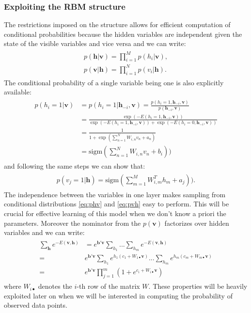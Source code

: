 \documentclass[../report/report.tex]{subfiles}
\begin{document}
\subsubsection{Exploiting the RBM structure}
The restrictions imposed on the structure allows for efficient computation of conditional probabilities because the hidden variables are independent given the state of the visible variables and vice versa and we can write:
\begin{align}
\begin{split}
p(\mathbf{h}| \mathbf{v}) = \prod_{i = 1}^{M} p(h_i |\mathbf{v}), \\
p(\mathbf{v}| \mathbf{h}) = \prod_{i = 1}^{N} p(v_i |\mathbf{h}).
\end{split}
\end{align}
The conditional probability of a single variable being one is also explicitly available: 
\begin{align}
\begin{split}
p(h_i = 1| \mathbf{v})& = p(h_i = 1| \mathbf{h}_{-i}, \mathbf{v}) = \frac{p(h_i = 1, \mathbf{h}_{-i}, \mathbf{v})}{p( \mathbf{h}_{-i}, \mathbf{v})} \\
& = \frac{\exp( -E(h_i=1,\mathbf{h}_{-i}, \mathbf{v})) }{\exp( -E(h_i=1,\mathbf{h}_{-i}, \mathbf{v})) + \exp( -E(h_i=0,\mathbf{h}_{-i}, \mathbf{v}))}\\
& = \frac{1}{1 + \exp( \sum_{n=1}^N W_{i,n} v_n + a_n)}\\
& = \text{sigm} (\sum_{n=1}^N W_{i,n} v_n + b_i))
\end{split}
\label{eq:phv}
\end{align}
and following the same steps we can show that:
 \begin{align}
\begin{split}
p(v_j = 1| \mathbf{h})=  \text{sigm} (\sum_{m=1}^M W^T_{i,m} h_m + a_j)).
\end{split}
\label{eq:pvh}
\end{align}
The independence between the variables in one layer makes sampling from conditional distributions \ref{eq:phv} and \ref{eq:pvh} easy to perform. This will be crucial for effective learning of this model when we don't know a priori the parameters. Moreover the nominator from the $p(\mathbf{v})$ factorizes over hidden variables and we can write:
\begin{align}
\begin{split}
 \sum_\mathbf{h} e^{-E(\mathbf{v}, \mathbf{h})} & = e^{\mathbf{b}'\mathbf{v}}\sum_{h_1}...\sum_{h_m}e^{-E(\mathbf{v}, \mathbf{h})} \\
=&  e^{\mathbf{b}'\mathbf{v}} \sum_{h_1} e^{h_1 (c_1 + W_{1\bullet}\mathbf{v})}... \sum_{h_m} e^{h_m (c_m + W_{m\bullet}\mathbf{v})} \\
= & e^{\mathbf{b}'\mathbf{v}} \prod_{j=1}^{m} \left( 1 + e^{c_i + W_{i\bullet}\mathbf{v}} \right)
\label{eq:clampedFreeEnergy}
\end{split}
\end{align}
where $W_{i\bullet}$ denotes the $i$-th row of the matrix $W$. These properties will be heavily exploited later on when we will be interested in computing the probability of observed data points. 
\end{document}
